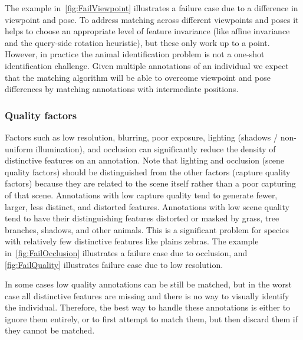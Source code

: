             The example in~\cref{fig:FailViewpoint} illustrates a failure case due to a difference in viewpoint
              and pose.
            To address matching across different viewpoints and poses it helps to choose an appropriate level of
              feature invariance (like affine invariance and the query-side rotation heuristic), but these only
              work up to a point.
            However, in practice the animal identification problem is not a one-shot identification challenge.
            Given multiple annotations of an individual we expect that the matching algorithm will be able to
              overcome viewpoint and pose differences by matching annotations with intermediate positions.

            \FailViewpoint{}

        \FloatBarrier{}
        \subsubsection{Quality factors}
            Factors such as low resolution, blurring, poor exposure, lighting (shadows / non-uniform
              illumination), and occlusion can significantly reduce the density of distinctive features on an
              annotation.
            Note that lighting and occlusion (scene quality factors) should be distinguished from the other
              factors (capture quality factors) because they are related to the scene itself rather than a poor
              capturing of that scene.
            Annotations with low capture quality tend to generate fewer, larger, less distinct, and distorted
              features.
            Annotations with low scene quality tend to have their distinguishing features distorted or masked by
              grass, tree branches, shadows, and other animals.
            This is a significant problem for species with relatively few distinctive features like plains
              zebras.
            The example in~\cref{fig:FailOcclusion} illustrates a failure case due to occlusion, and
              \cref{fig:FailQuality} illustrates failure case due to low resolution.

            In some cases low quality annotations can be still be matched, but in the worst case all distinctive
              features are missing and there is no way to visually identify the individual.
            Therefore, the best way to handle these annotations is either to ignore them entirely, or to first
              attempt to match them, but then discard them if they cannot be matched.

